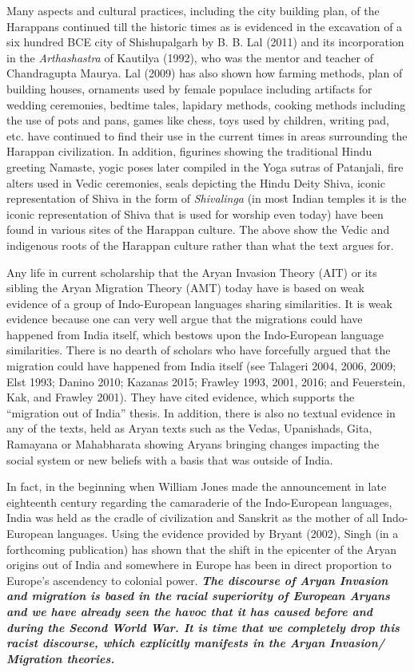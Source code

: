 \noindent
Many aspects and cultural practices, including the city building plan, of the Harappans continued till the historic times as is evidenced in the excavation of a six hundred BCE city of Shishupalgarh by B. B. Lal (2011) and its incorporation in the \textit{Arthashastra} of Kautilya (1992), who was the mentor and teacher of Chandragupta Maurya. Lal (2009) has also shown how farming methods, plan of building houses, ornaments used by female populace including artifacts for wedding ceremonies, bedtime tales, lapidary methods, cooking methods including the use of pots and pans, games like chess, toys used by children, writing pad, etc. have continued to find their use in the current times in areas surrounding the Harappan civilization. In addition, figurines showing the traditional Hindu greeting Namaste, yogic poses later compiled in the Yoga sutras of Patanjali, fire alters used in Vedic ceremonies, seals depicting the Hindu Deity Shiva, iconic representation of Shiva in the form of \textit{Shivalinga} (in most Indian temples it is the iconic representation of Shiva that is used for worship even today) have been found in various sites of the Harappan culture. The above show the Vedic and indigenous roots of the Harappan culture rather than what the text argues for. 

Any life in current scholarship that the Aryan Invasion Theory (AIT) or its sibling the Aryan Migration Theory (AMT) today have is based on weak evidence of a group of Indo-European languages sharing similarities. It is weak evidence because one can very well argue that the migrations could have happened from India itself, which bestows upon the Indo-European language similarities. There is no dearth of scholars who have forcefully argued that the migration could have happened from India itself (see Talageri 2004, 2006, 2009; Elst 1993; Danino 2010; Kazanas 2015; Frawley 1993, 2001, 2016; and Feuerstein, Kak, and Frawley 2001). They have cited evidence, which supports the “migration out of India” thesis. In addition, there is also no textual evidence in any of the texts, held as Aryan texts such as the Vedas, Upanishads, Gita, Ramayana or Mahabharata showing Aryans bringing changes impacting the social system or new beliefs with a basis that was outside of India.

In fact, in the beginning when William Jones made the announcement in late eighteenth century regarding the camaraderie of the Indo-European languages, India was held as the cradle of civilization and Sanskrit as the mother of all Indo-European languages. Using the evidence provided by Bryant (2002), Singh (in a forthcoming publication) has shown that the shift in the epicenter of the Aryan origins out of India and somewhere in Europe has been in direct proportion to Europe’s ascendency to colonial power. \textit{\textbf{The discourse of Aryan Invasion and migration is based in the racial superiority of European Aryans and we have already seen the havoc that it has caused before and during the Second World War. It is time that we completely drop this racist discourse, which explicitly manifests in the Aryan Invasion/ Migration theories.}} 

